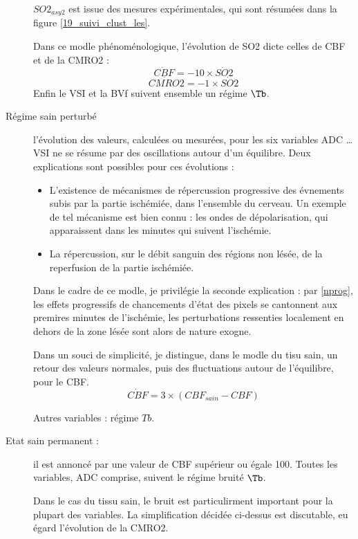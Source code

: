 \begin{description}
$SO2_{asy2}$ est issue des mesures exp\'erimentales, qui sont r\'esum\'ees dans la figure \ref{19_suivi_clust_les}.
\par
Dans ce modle ph\'enom\'enologique, l'\'evolution de SO2 dicte celles de CBF et de la CMRO2 :
\begin{equation}
\dot{CBF}=-10\times\dot{SO2}
\end{equation}
\begin{equation}
\dot{CMRO2}=-1\times\dot{SO2}
\end{equation}
Enfin le VSI et la BVf suivent ensemble un r\'egime $\Tb$.
%
\item[R\'egime sain perturb\'e] l'\'evolution des valeurs, calcul\'ees ou mesur\'ees, pour les six variables ADC \dots VSI %
ne se r\'esume par  des oscillations autour d'un \'equilibre. Deux explications sont possibles pour ces \'evolutions :
\begin{itemize}
\item L'existence de m\'ecanismes de r\'epercussion progressive des \'evnements subis par la partie isch\'emi\'ee, %
dans l'ensemble du cerveau. Un exemple de tel m\'ecanisme est bien connu : les ondes de d\'epolarisation, qui apparaissent dans les minutes qui suivent l'isch\'emie.
%
\item La r\'epercussion, sur le d\'ebit sanguin des r\'egions non l\'es\'ee, de la reperfusion de la partie isch\'emi\'ee.
\end{itemize}

\par
Dans le cadre de ce modle, je privil\'egie la seconde explication : par \ref{nprog}, %
les effets progressifs de chancements d'\'etat des pixels se cantonnent aux premires minutes de l'isch\'emie, %
les perturbations ressenties localement en dehors de la zone l\'es\'ee sont alors de nature exogne.

\par
Dans un souci de simplicit\'e, je distingue, dans le modle du tisu sain, %
un retour  des valeurs normales, puis des fluctuations autour de l'\'equilibre, pour le CBF.
\begin{equation}
\dot{CBF}=3\times (CBF_{sain}-CBF)
\end{equation}

Autres variables : r\'egime $Tb$.
\item[Etat sain permanent : ] il est annonc\'e par une valeur de CBF sup\'erieur ou \'egale  100. %
Toutes les variables, ADC comprise, suivent le r\'egime bruit\'e $\Tb$.

\par
Dans le cas du tissu sain, le bruit est particulirment important pour la plupart des variables. %
La simplification d\'ecid\'ee ci-dessus est discutable, eu \'egard l'\'evolution de la CMRO2.
\end{description}




